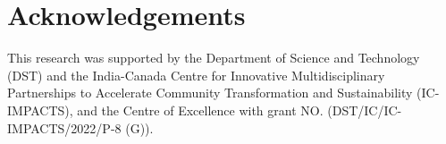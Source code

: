 \documentclass[journal]{IEEEtran}
\begin{document}
 \section*{Acknowledgements} This research was supported by the Department of Science and Technology (DST) and the India-Canada Centre for Innovative Multidisciplinary Partnerships to Accelerate Community Transformation and Sustainability (IC-IMPACTS), and the Centre of Excellence with grant NO. (DST/IC/IC-IMPACTS/2022/P-8 (G)).
 
 
 

\ifCLASSOPTIONcaptionsoff
  \newpage
\fi
\medskip


\end{document}
